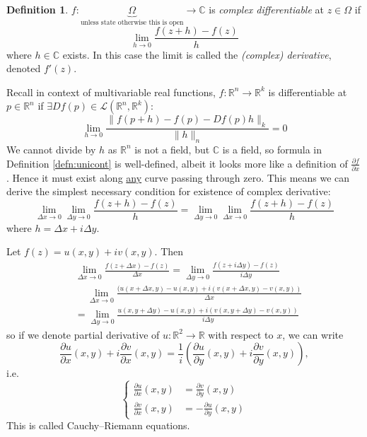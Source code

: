 \documentclass[a4paper]{article}
\theoremstyle{definition}
\newtheorem{defn}{Definition}[subsection]
\begin{document}
\begin{defn}
$f:\underbrace{\Omega}_{\text{unless state otherwise this is open}} \rightarrow \mathbb C$ is \textit{complex differentiable} at $z\in \Omega$ if
\[
\lim_{h\rightarrow 0} \frac{f(z+h)-f(z)}{h}
\]
where $h\in \mathbb C$ exists. In this case the limit is called the \textit{(complex) derivative}, denoted $f'(z)$.
\end{defn}

Recall in context of multivariable real functions, $f:\mathbb R^n \rightarrow \mathbb R^k$ is differentiable at $p\in \mathbb R^n$ if $\exists Df(p) \in \mathcal L(\mathbb R^n,\mathbb R^k) :$
\[
\lim_{h\rightarrow 0} \frac{\|f(p+h)-f(p)-Df(p)h\|_k}{\|h\|_n} =0
\]
We cannot divide by $h$ as $\mathbb R^n$ is not a field, but $\mathbb C$ is a field, so formula in Definition \ref{defn:unicont} is well-defined, albeit it looks more like a definition of $\frac{\partial f}{\partial x}$. Hence it must exist along \underline{any} curve passing through zero. This means we can derive the simplest necessary condition for existence of complex derivative:
\[
\lim_{\Delta x\rightarrow 0} \lim_{\Delta y\rightarrow 0} \frac{f(z+h)-f(z)}{h}=\lim_{\Delta y\rightarrow 0} \lim_{\Delta x\rightarrow 0} \frac{f(z+h)-f(z)}{h}
\]
where $h=\Delta x+i\Delta y$.

Let $f(z)=u(x,y)+iv(x,y).$ Then
\[
\begin{aligned}
& \lim_{\Delta x\rightarrow 0} \frac{f(z+\Delta x) -f(z)}{\Delta x} = \lim_{\Delta y \rightarrow 0} \frac{f(z+i\Delta y)-f(z)}{i\Delta y} \\
&\quad \ \lim_{\Delta x\rightarrow 0} \frac{(u(x+\Delta x, y) - u(x,y) + i(v(x+\Delta x,y)-v(x,y))}{\Delta x}  \\ &= \lim_{\Delta y\rightarrow 0} \frac{u(x,y+\Delta y)-u(x,y) + i (v(x,y+\Delta y) - v(x,y))}{i\Delta y} 
\end{aligned}
\]
so if we denote partial derivative of $u:\mathbb R^2 \rightarrow \mathbb R$ with respect to $x$, we can write
\[
\frac{\partial u}{\partial x} (x,y) + i \frac{\partial v}{\partial x} (x,y) = \frac{1}{i} \left( \frac{\partial u}{\partial y} (x,y) + i \frac{\partial v}{\partial y}(x,y) \right),
\]
i.e.
\[
\left\{\begin{aligned}
\frac{\partial u}{\partial x}(x,y) &= \frac{\partial v}{\partial y} (x,y) \\
\frac{\partial v}{\partial x}(x,y) &= -\frac{\partial u}{\partial y} (x,y)
\end{aligned} \right.
\]
This is called Cauchy–Riemann equations.
\end{document}
